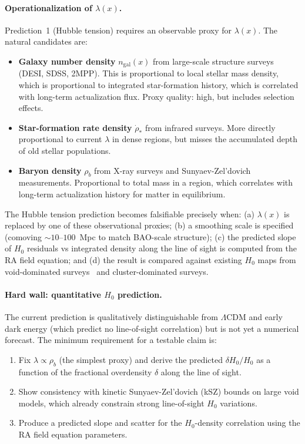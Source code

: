 \documentclass[11pt,a4paper]{article}
\theoremstyle{plain}
\theoremstyle{definition}
\theoremstyle{remark}
\begin{document}
\paragraph{Operationalization of $\lambda(x)$.}
Prediction~1 (Hubble tension) requires an observable proxy for $\lambda(x)$. The
natural candidates are:
\begin{itemize}[noitemsep]
  \item \textbf{Galaxy number density} $n_{\mathrm{gal}}(x)$ from large-scale
  structure surveys (DESI, SDSS, 2MPP). This is proportional to local stellar
  mass density, which is proportional to integrated star-formation history, which
  is correlated with long-term actualization flux. Proxy quality: high, but
  includes selection effects.
  \item \textbf{Star-formation rate density} $\dot{\rho}_*$ from infrared surveys.
  More directly proportional to current $\lambda$ in dense regions, but misses
  the accumulated depth of old stellar populations.
  \item \textbf{Baryon density} $\rho_b$ from X-ray surveys and Sunyaev-Zel'dovich
  measurements. Proportional to total mass in a region, which correlates with
  long-term actualization history for matter in equilibrium.
\end{itemize}
The Hubble tension prediction becomes falsifiable precisely when: (a) $\lambda(x)$
is replaced by one of these observational proxies; (b) a smoothing scale is
specified (comoving $\sim 10$--$100$~Mpc to match BAO-scale structure); (c) the
predicted slope of $H_0$ residuals vs integrated density along the line of sight
is computed from the RA field equation; and (d) the result is compared against
existing $H_0$ maps from void-dominated surveys~\citep{Kenworthy2019} and
cluster-dominated surveys.

\paragraph{Hard wall: quantitative $H_0$ prediction.}
The current prediction is qualitatively distinguishable from $\Lambda$CDM and
early dark energy (which predict no line-of-sight correlation) but is not yet
a numerical forecast. The minimum requirement for a testable claim is:
\begin{enumerate}[noitemsep]
  \item Fix $\lambda \propto \rho_b$ (the simplest proxy) and derive the
  predicted $\delta H_0 / H_0$ as a function of the fractional overdensity
  $\delta$ along the line of sight.
  \item Show consistency with kinetic Sunyaev-Zel'dovich (kSZ) bounds on large
  void models, which already constrain strong line-of-sight $H_0$ variations.
  \item Produce a predicted slope and scatter for the $H_0$-density correlation
  using the RA field equation parameters.
\end{enumerate}
\end{document}
